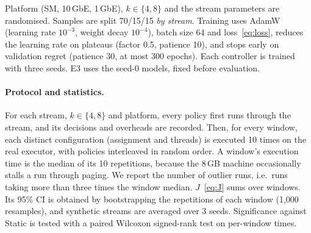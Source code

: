 Platform (SM, 10\,GbE, 1\,GbE), $k\in\{4,8\}$ and the stream parameters are randomised.
Samples are split 70/15/15 \emph{by stream}. Training uses AdamW (learning rate $10^{-3}$,
weight decay $10^{-4}$), batch size 64 and loss~\eqref{eq:loss}, reduces the learning rate on
plateaus (factor 0.5, patience 10), and stops early on validation regret (patience 30, at most
300 epochs). Each controller is trained with three seeds. E3 uses the seed-0 models, fixed
before evaluation.

\paragraph{Protocol and statistics.}
For each stream, $k\in\{4,8\}$ and platform, every policy first runs through the stream, and
its decisions and overheads are recorded. Then, for every window, each distinct configuration
(assignment and threads) is executed 10 times on the real executor, with policies interleaved
in random order. A window's execution time is the median of its 10 repetitions, because the
8\,GB machine occasionally stalls a run through paging. We report the number of outlier runs,
i.e.\ runs taking more than three times the window median. $J$~\eqref{eq:J} sums over windows.
Its 95\% CI is obtained by bootstrapping the repetitions of each window (1{,}000 resamples), and
synthetic streams are averaged over 3 seeds. Significance against Static is tested with a
paired Wilcoxon signed-rank test on per-window times.
